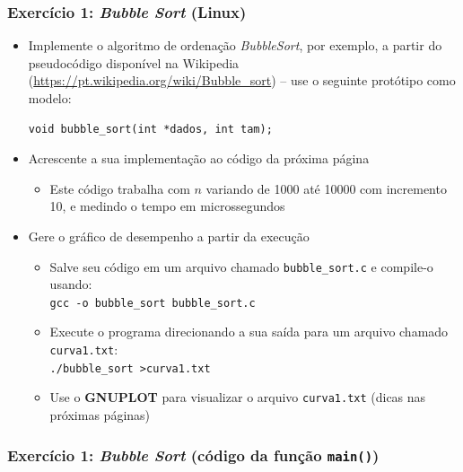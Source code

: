 \documentclass[aspectratio=169]{beamer}
\begin{document}
\begin{frame}[fragile]\frametitle{Exercício 1: \emph{Bubble Sort} (Linux)}
\begin{itemize}
	\item Implemente o algoritmo de ordenação \emph{BubbleSort}, por exemplo, a partir do pseudocódigo disponível na Wikipedia (\url{https://pt.wikipedia.org/wiki/Bubble_sort}) -- use o seguinte protótipo como modelo:
{\scriptsize
\begin{lstlisting}
void bubble_sort(int *dados, int tam);
\end{lstlisting}}
	\item Acrescente a sua implementação ao código da próxima página
	\begin{itemize}
		\item Este código trabalha com $n$ variando de 1000 até 10000 com incremento 10, e medindo o tempo em microssegundos
	\end{itemize}
	\item Gere o gráfico de desempenho a partir da execução
	\begin{itemize}
		\item Salve seu código em um arquivo chamado \texttt{bubble\_sort.c} e compile-o usando:\\
		\texttt{gcc -o bubble\_sort bubble\_sort.c}
		\item Execute o programa direcionando a sua saída para um arquivo chamado \texttt{curva1.txt}:\\
		\texttt{./bubble\_sort \textgreater curva1.txt}
		\item Use o \textbf{GNUPLOT} para visualizar o arquivo \texttt{curva1.txt} (dicas nas próximas páginas)
	\end{itemize}
\end{itemize}
\end{frame}

\begin{frame}[fragile]\frametitle{Exercício 1: \emph{Bubble Sort} (código da função \texttt{main()})}
{\fontsize{0}{5.4}\selectfont}
\end{frame}
\end{document}

